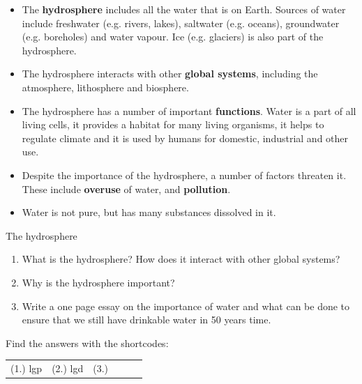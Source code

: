       \label{m38138*id342453}\begin{itemize}[noitemsep]
            \label{m38138*uid92}\item The \textbf{hydrosphere} includes all the water that is on Earth. Sources of water include freshwater (e.g. rivers, lakes), saltwater (e.g. oceans), groundwater (e.g. boreholes) and water vapour. Ice (e.g. glaciers) is also part of the hydrosphere.
\label{m38138*uid93}\item The hydrosphere interacts with other \textbf{global systems}, including the atmosphere, lithosphere and biosphere.
\label{m38138*uid94}\item The hydrosphere has a number of important \textbf{functions}. Water is a part of all living cells, it provides a habitat for many living organisms, it helps to regulate climate and it is used by humans for domestic, industrial and other use.
\label{m38138*uid106}\item Despite the importance of the hydrosphere, a number of factors threaten it. These include \textbf{overuse} of water, and \textbf{pollution}.
\item Water is not pure, but has many substances dissolved in it. 
\end{itemize}
\begin{eocexercises}{The hydrosphere}
            \nopagebreak
\label{m38138*fs-id1169173692606}\begin{enumerate}[noitemsep, label=\textbf{\arabic*}. ] 
            \item What is the hydrosphere? How does it interact with other global systems?\newline
            \item Why is the hydrosphere important?\newline
\item Write a one page essay on the importance of water and what can be done to ensure that we still have drinkable water in 50 years time.
\end{enumerate}
\practiceinfo
\par {} Find the answers with the shortcodes:
 \par \begin{tabular}[h]{cccccc}
 (1.) lgp  &  (2.) lgd  & (3.)  \end{tabular}
\end{eocexercises}
